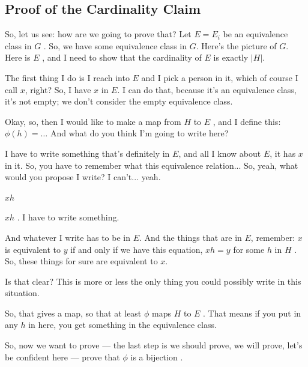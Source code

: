 \subsection{Proof of the Cardinality Claim}

\begin{speech}[00:22:28 - 00:23:53]
So, let us see: how are we going to prove that? Let $E = E_i$ be an equivalence class in $G$ . So, we have some equivalence class in $G$. Here's the picture of $G$. Here is $E$ , and I need to show that the cardinality of $E$ is exactly $|H|$.

The first thing I do is I reach into $E$ and I pick a person in it, which of course I call $x$, right?  So, I have $x$ in $E$. I can do that, because it's an equivalence class, it's not empty; we don't consider the empty equivalence class.

Okay, so, then I would like to make a map from $H$ to $E$ , and I define this: $\phi(h) = \dots$  And what do you think I'm going to write here?

I have to write something that's definitely in $E$, and all I know about $E$, it has $x$ in it. So, you have to remember what this equivalence relation... So, yeah, what would you propose I write? I can't... yeah.
\end{speech}

\begin{student}
$xh$
\end{student}

\begin{speech}[00:23:54 - 00:25:12]
$xh$ . I have to write something.

And whatever I write has to be in $E$. And the things that are in $E$, remember: $x$ is equivalent to $y$ if and only if we have this equation, $xh = y$ for some $h$ in $H$ . So, these things for sure are equivalent to $x$.

Is that clear? This is more or less the only thing you could possibly write in this situation.

So, that gives a map, so that at least $\phi$ maps $H$ to $E$ . That means if you put in any $h$ in here, you get something in the equivalence class.

So, now we want to prove --- the last step is we should prove, we will prove, let's be confident here --- prove that $\phi$ is a bijection .
\end{speech}

